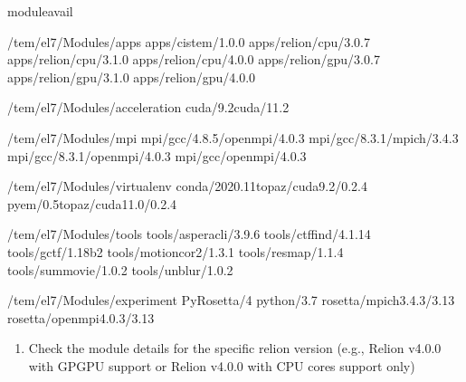 \documentclass[a4paper,11pt,english]{sphinxmanual}
\begin{document}
\begin{sphinxVerbatim}[commandchars=\\\{\}]
\PYGZdl{}\PYGZgt{}moduleavail

\PYGZhy{}\PYGZhy{}\PYGZhy{}\PYGZhy{}\PYGZhy{}\PYGZhy{}\PYGZhy{}\PYGZhy{}/tem/el7/Modules/apps\PYGZhy{}\PYGZhy{}\PYGZhy{}\PYGZhy{}\PYGZhy{}\PYGZhy{}\PYGZhy{}\PYGZhy{}
apps/cistem/1.0.0
apps/relion/cpu/3.0.7
apps/relion/cpu/3.1.0
apps/relion/cpu/4.0.0
apps/relion/gpu/3.0.7
apps/relion/gpu/3.1.0
apps/relion/gpu/4.0.0

\PYGZhy{}\PYGZhy{}\PYGZhy{}\PYGZhy{}/tem/el7/Modules/acceleration\PYGZhy{}\PYGZhy{}\PYGZhy{}\PYGZhy{}
cuda/9.2cuda/11.2

\PYGZhy{}\PYGZhy{}\PYGZhy{}\PYGZhy{}\PYGZhy{}\PYGZhy{}\PYGZhy{}\PYGZhy{}/tem/el7/Modules/mpi\PYGZhy{}\PYGZhy{}\PYGZhy{}\PYGZhy{}\PYGZhy{}\PYGZhy{}\PYGZhy{}\PYGZhy{}\PYGZhy{}
mpi/gcc/4.8.5/openmpi/4.0.3
mpi/gcc/8.3.1/mpich/3.4.3
mpi/gcc/8.3.1/openmpi/4.0.3
mpi/gcc/openmpi/4.0.3

\PYGZhy{}\PYGZhy{}\PYGZhy{}\PYGZhy{}\PYGZhy{}/tem/el7/Modules/virtualenv\PYGZhy{}\PYGZhy{}\PYGZhy{}\PYGZhy{}\PYGZhy{}
conda/2020.11topaz/cuda\PYGZhy{}9.2/0.2.4
pyem/0.5topaz/cuda\PYGZhy{}11.0/0.2.4

\PYGZhy{}\PYGZhy{}\PYGZhy{}\PYGZhy{}\PYGZhy{}\PYGZhy{}\PYGZhy{}/tem/el7/Modules/tools\PYGZhy{}\PYGZhy{}\PYGZhy{}\PYGZhy{}\PYGZhy{}\PYGZhy{}\PYGZhy{}\PYGZhy{}
tools/aspera\PYGZhy{}cli/3.9.6
tools/ctffind/4.1.14
tools/gctf/1.18\PYGZus{}b2
tools/motioncor2/1.3.1
tools/resmap/1.1.4
tools/summovie/1.0.2
tools/unblur/1.0.2

\PYGZhy{}\PYGZhy{}\PYGZhy{}\PYGZhy{}\PYGZhy{}/tem/el7/Modules/experiment\PYGZhy{}\PYGZhy{}\PYGZhy{}\PYGZhy{}\PYGZhy{}
PyRosetta/4
python/3.7
rosetta/mpich\PYGZhy{}3.4.3/3.13
rosetta/openmpi\PYGZhy{}4.0.3/3.13
\end{sphinxVerbatim}
\begin{enumerate}
%
\setcounter{enumi}{1}
\item {} 
\sphinxAtStartPar
Check the module details for the specific relion version (e.g., Relion v4.0.0 with GPGPU support or Relion v4.0.0 with CPU cores support only)

\end{enumerate}
\end{document}
